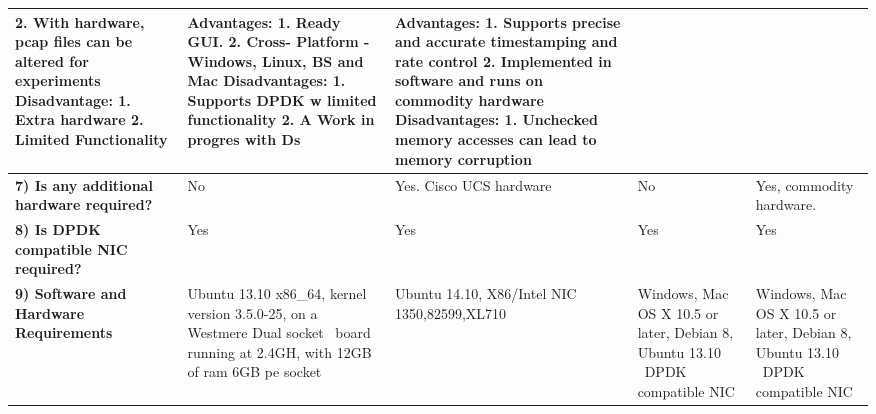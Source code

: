\begin{table}[ht!]
\begin{adjustbox}{width=1.25\textwidth, center}
\begin{tabular}{| L{3cm} | L{3cm} | L{3cm} | L{3cm} | L{3cm} |}
            \textbf{2.} With hardware, pcap files can be altered for experiments \newline
            \textbf{Disadvantage:} \newline
            \textbf{1.} Extra hardware \newline
            \textbf{2.} Limited Functionality &
            \textbf{Advantages:} \newline
            \textbf{1.} Ready GUI. \newline
            \textbf{2.} Cross- Platform - Windows, Linux, BS and Mac  \newline
            \textbf{Disadvantages:} \newline
            \textbf{1.} Supports DPDK w limited functionality \newline
            \textbf{2.} A Work in progres with Ds &
            \textbf{Advantages:} \newline
            \textbf{1.} Supports precise and accurate timestamping and rate control \newline
            \textbf{2.} Implemented in software and runs on commodity hardware
            \textbf{Disadvantages:} \newline
            \textbf{1.} Unchecked memory accesses can lead to memory corruption
            \\ \hline
            \textbf{7) Is any additional hardware required?} &
            No &
            Yes. Cisco UCS hardware &
            No &
            Yes, commodity hardware.
            \\ \hline
            \textbf{8) Is DPDK compatible NIC required?} &
            Yes &
            Yes &
            Yes &
            Yes
            \\ \hline
            \textbf{9) Software and Hardware Requirements } &
            Ubuntu 13.10 x86\_64, kernel version 3.5.0-25, on a Westmere Dual socket \newline~\newline board running at 2.4GH, with 12GB of ram 6GB pe socket  &
            Ubuntu 14.10, X86/Intel NIC 1350,82599,XL710  &
            Windows, Mac OS X 10.5 or later, Debian 8, Ubuntu 13.10 \newline~\newline DPDK compatible NIC  &
            Windows, Mac OS X 10.5 or later, Debian 8, Ubuntu 13.10 \newline~\newline DPDK compatible NIC
            \\ \hline

\end{tabular}
\end{adjustbox}
\end{table}

